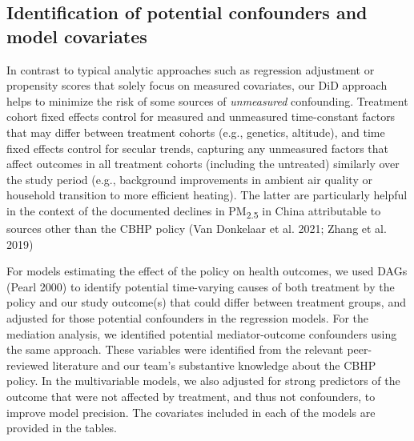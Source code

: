 \documentclass[
  letterpaper,
  DIV=11,
  numbers=noendperiod]{scrartcl}
\begin{document}
\subsection{Identification of potential confounders and model
covariates}\label{identification-of-potential-confounders-and-model-covariates}

In contrast to typical analytic approaches such as regression adjustment
or propensity scores that solely focus on measured covariates, our DiD
approach helps to minimize the risk of some sources of \emph{unmeasured}
confounding. Treatment cohort fixed effects control for measured and
unmeasured time-constant factors that may differ between treatment
cohorts (e.g., genetics, altitude), and time fixed effects control for
secular trends, capturing any unmeasured factors that affect outcomes in
all treatment cohorts (including the untreated) similarly over the study
period (e.g., background improvements in ambient air quality or
household transition to more efficient heating). The latter are
particularly helpful in the context of the documented declines in
PM\textsubscript{2.5} in China attributable to sources other than the
CBHP policy (Van Donkelaar et al. 2021; Zhang et al. 2019)

For models estimating the effect of the policy on health outcomes, we
used DAGs (Pearl 2000) to identify potential time-varying causes of both
treatment by the policy and our study outcome(s) that could differ
between treatment groups, and adjusted for those potential confounders
in the regression models. For the mediation analysis, we identified
potential mediator-outcome confounders using the same approach. These
variables were identified from the relevant peer-reviewed literature and
our team's substantive knowledge about the CBHP policy. In the
multivariable models, we also adjusted for strong predictors of the
outcome that were not affected by treatment, and thus not confounders,
to improve model precision. The covariates included in each of the
models are provided in the tables.
\end{document}
